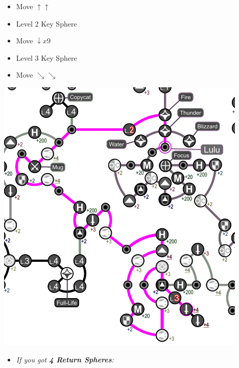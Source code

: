 \begin{spheregrid}
    \begin{multicols}{2}
        \begin{itemize}
            \luluf
            \begin{itemize}
                \item Move $\uparrow\uparrow$
                \item Level 2 Key Sphere
                \item Move $\downarrow x9$
                \item Level 3 Key Sphere
                \item Move $\searrow\searrow$
            \end{itemize}
            \includegraphics[width=.75\columnwidth]{graphics/lulu_grid}
            \yunaf
            \begin{itemize}
                \item \textit{If you got \textbf{4 Return Spheres}:}
                    \begin{itemize}
\end{itemize}
\end{itemize}
\end{itemize}
\end{multicols}
\end{spheregrid}
